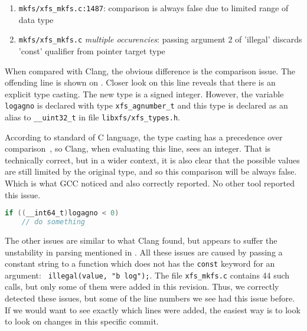 \begin{enumerate}
	\item {\tt mkfs/xfs\_mkfs.c:1487}: comparison is always false due
		to limited range of data type
	\item {\tt mkfs/xfs\_mkfs.c} {\em multiple occurencies}: passing
		argument 2 of 'illegal' discards 'const' qualifier from
		pointer target type
\end{enumerate}

When compared with Clang, the obvious difference is the comparison issue.
The offending line is shown on . Closer
look on this line reveals that there is an explicit type casting. The new
type is a signed integer. However, the variable {\tt logagno} is declared
with type {\tt xfs\_agnumber\_t} and this type is declared as an alias to
{\tt \_\_uint32\_t} in file {\tt libxfs/xfs\_types.h}.

According to standard of C language, the type casting has a precedence over
comparison~\cite[A.2.1]{ISO9899}, so Clang, when evaluating this line, sees
an integer. That is technically correct, but in a wider context, it is also
clear that the possible values are still limited by the original type, and
so this comparison will be always false.  Which is what GCC noticed and
also correctly reported. No other tool reported this issue.


\begin{lstlisting}[frame=none, basicstyle=\footnotesize\ttfamily,
language=C, numbers=none, numberstyle=\tiny\color{black},caption=
{Line on which GCC found the comparison issue.},
label={lst:results:logagnoComparison}]
if ((__int64_t)logagno < 0)
	// do something
\end{lstlisting}

The other issues are similar to what Clang found, but appears to suffer the
unstability in parsing mentioned in .
All these issues are caused by passing a constant string to a
function which does not has the {\tt const} keyword for an argument: {\tt
illegal(value, "b log");}. The file {\tt xfs\_mkfs.c} contains 44 such
calls, but only some of them were added in this revision. Thus, we correctly
detected these issues, but some of the line numbers we see had this issue
before. If we would want to see exactly which lines were added, the easiest way
is to look to look on changes in this specific commit.


